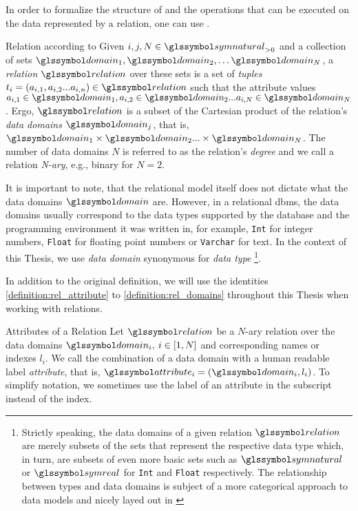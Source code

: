 In order to formalize the structure of and the operations that can be executed on the data represented by a relation, one can use . 

\begin{definition}[label=definition:relation]{Relation according to \cite{Codd:1970Relational}}{}
    Given $i,j,N \in \symnatural_{> 0}$ and a collection of sets $\domain_1, \domain_2, \ldots \domain_N$, a \emph{relation} $\relation$ over these sets is a set of \emph{tuples} $t_i = (a_{i,1}, a_{i,2} ... a_{i,n}) \in \relation$ such that the attribute values $a_{i,1} \in \domain_1, a_{i,2} \in \domain_2 ... a_{i,N} \in \domain_N$. Ergo, $\relation$ is a subset of the Cartesian product of the relation's \emph{data domains} $\domain_j$, that is, $\domain_1 \times \domain_2 ... \times \domain_N$. The number of data domains $N$ is referred to as the relation's \emph{degree} and we call a relation \emph{N-ary}, e.g., binary for $N=2$. 
\end{definition}


It is important to note, that the relational model itself does not dictate what the data domains $\domain$ are. However, in a relational \acrshort{dbms}, the data domains usually correspond to the data types supported by the database and the programming environment it was written in, for example, \lstinline{Int} for integer numbers, \lstinline{Float} for floating point numbers or \lstinline{Varchar} for text. In the context of this Thesis, we use \emph{data domain} synonymous for \emph{data type} \footnote{Strictly speaking, the data domains of a given relation $\relation$ are merely subsets of the sets that represent the respective data type which, in turn, are subsets of even more basic sets such as $\symnatural$ or $\symreal$ for \lstinline{Int} and \lstinline{Float} respectively. The relationship between types and data domains is subject of a more categorical approach to data models and nicely layed out in \cite{Spivak:2009Simplicial}}.

In addition to the original definition, we will use the identities \ref{definition:rel_attribute} to \ref{definition:rel_domains} throughout this Thesis when working with relations.

\begin{definition}[label=definition:rel_attribute]{Attributes of a Relation}{}
    Let $\relation$ be a $N$-ary relation over the data domains $\domain_i, \: i \in \left[1, N \right]$ and corresponding names or indexes $l_i$. We call the combination of a data domain with a human readable label \emph{attribute}, that is, $\attribute_{i} = (\domain_i, l_i)$. To simplify notation, we sometimes use the label of an attribute in the subscript instead of the index.
\end{definition}

